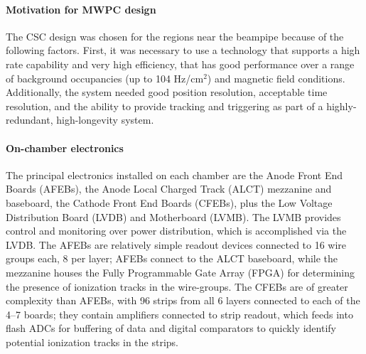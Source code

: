 \documentclass[a4paper,11pt]{article}
\begin{document}
\paragraph{Motivation for MWPC design}
The CSC design was chosen for the regions near the beampipe because of the following factors. First, it was necessary to use a technology that supports a high rate capability and very high efficiency, that has good performance over a range of background occupancies (up to 104 Hz/cm$^2$) and magnetic field conditions.
Additionally, the system needed good position resolution, acceptable time resolution, and the ability to provide tracking and triggering as part of a highly-redundant, high-longevity system.

\paragraph{On-chamber electronics}
The principal electronics installed on each chamber are the Anode Front End Boards (AFEBs), the Anode Local Charged Track (ALCT) mezzanine and baseboard, 
the Cathode Front End Boards (CFEBs), plus the Low Voltage Distribution Board (LVDB) and Motherboard (LVMB). The LVMB provides control and monitoring over power distribution, which is accomplished via the LVDB. The AFEBs are relatively simple readout devices connected to 16 wire groups each, 8 per layer; AFEBs connect to the ALCT baseboard, while the mezzanine houses the Fully Programmable Gate Array (FPGA) for determining the presence of ionization tracks in the wire-groups. The CFEBs are of greater complexity than AFEBs, with 96 strips from all 6 layers connected to each of the 4--7 boards; they contain amplifiers connected to strip readout, which feeds into flash ADCs for buffering of data and digital comparators to quickly identify potential ionization tracks in the strips. 
\end{document}
